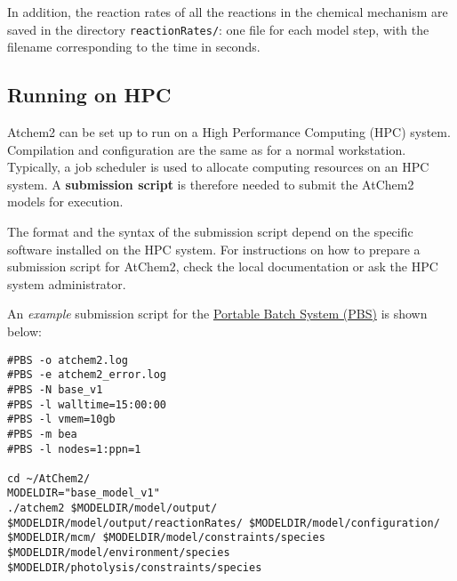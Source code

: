 In addition, the reaction rates of all the reactions in the chemical
mechanism are saved in the directory \texttt{reactionRates/}: one file
for each model step, with the filename corresponding to the time in
seconds.

\hypertarget{running-on-hpc}{%
\subsection{Running on HPC}\label{running-on-hpc}}

Atchem2 can be set up to run on a High Performance Computing (HPC)
system. Compilation and configuration are the same as for a normal
workstation. Typically, a job scheduler is used to allocate computing
resources on an HPC system. A \textbf{submission script} is therefore
needed to submit the AtChem2 models for execution.

The format and the syntax of the submission script depend on the
specific software installed on the HPC system. For instructions on how
to prepare a submission script for AtChem2, check the local
documentation or ask the HPC system administrator.

An \emph{example} submission script for the
\href{https://en.wikipedia.org/wiki/Portable_Batch_System}{Portable
Batch System (PBS)} is shown below:

\begin{verbatim}
#PBS -o atchem2.log
#PBS -e atchem2_error.log
#PBS -N base_v1
#PBS -l walltime=15:00:00
#PBS -l vmem=10gb
#PBS -m bea
#PBS -l nodes=1:ppn=1

cd ~/AtChem2/
MODELDIR="base_model_v1"
./atchem2 $MODELDIR/model/output/ $MODELDIR/model/output/reactionRates/ $MODELDIR/model/configuration/ $MODELDIR/mcm/ $MODELDIR/model/constraints/species $MODELDIR/model/environment/species $MODELDIR/photolysis/constraints/species
\end{verbatim}
